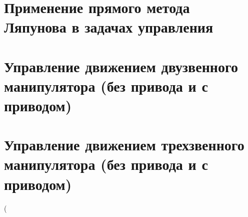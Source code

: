 \documentclass[14pt,a4paper,final,russian]{report}
\numberwithin{theorem}{chapter}
\numberwithin{lemma}{chapter}
\numberwithin{consectary}{chapter}
\numberwithin{pointout}{chapter}
\numberwithin{definition}{chapter}
\begin{document}
	\vglue 0.5cm
	
	\dotfill\mbox{\ \ \pageref{postfix}} \vglue 0.5cm
	
	 \dotfill\mbox{\ \ \pageref{bibl}}
	\par \vglue 0.5cm
	 \dotfill\mbox{\ \ \pageref{app1start}}
	
	\newpage
	
	\fontsize{14pt}{21pt}\selectfont
	
	
	
	\chapter{Применение прямого метода Ляпунова в задачах управления}
	
	
	 
	
	\chapter{Управление движением двузвенного манипулятора (без привода и с приводом)}
	
	
	 
	
	\chapter{Управление движением трехзвенного манипулятора (без привода и с приводом)}
	
	
	 
	
	
	
	
	
\left( 	
\end{document}
